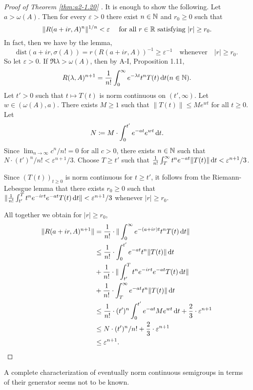 \begin{proof}[Proof of Theorem  \ref{thm:a2-1.20}  ]
It is enough to show the following.
Let $a > \omega(A)$.
Then for every $\varepsilon > 0$ there exist $n \in \mathbb{N}$ and $r_0 \geq 0$ such that
\[
\|R(a+ir,A)^n\|^{1/n} < \varepsilon \quad  \text{ for all } r \in \mathbb{R} \text{ satisfying } |r| \geq r_{0}.
\]
In fact, then we have by the lemma, 
\[
\text{dist}(a+ir,\sigma(A)) = r(R(a+ir,A))^{-1} \geq \varepsilon^{-1} \quad \text{whenever} \quad |r| \geq r_{0}.
\]
So let $\varepsilon > 0$.
If $\Re\lambda > \omega(A)$, then by A-I, Proposition 1.11,
\[
R(\lambda,A)^{n+1} = \frac{1}{n!}\int_0^\infty e^{-\lambda t}t^nT(t) \mathop{}\!\mathrm{d}{t} (n \in \mathbb{N}).
\]
Let $t' > 0$ such that $t \mapsto T(t)$ is norm continuous on $(t',\infty)$.
Let $w \in (\omega(A),a)$.
There exists $M \geq 1$ such that $\|T(t)\| \leq Me^{wt}$ for all $t \geq 0$.
Let 
\[
N \coloneqq M\cdot\int_{0}^{t'} e^{-at}e^{wt} \mathop{}\!\mathrm{d}{t}.
\]
Since $\lim_{n\to\infty} c^n/n! = 0$ for all $c > 0$, there exists $n \in \mathbb{N}$ such that \\ 
$N\cdot(t')^n/n! < \varepsilon^{n+1}/3$.
Choose $T \geq t'$ such that $\frac{1}{n!}\int_T^\infty t^ne^{-at}\|T(t)\| \mathop{}\!\mathrm{d}{t} < \varepsilon^{n+1}/3$.

Since $(T(t))_{t\geq 0}$ is norm continuous for $t \geq t'$, it follows from the Riemann-Lebesgue lemma that there exists $r_{0} \geq 0$ such that 
$\|\frac{1}{n!}\int_{t'}^T t^{n}e^{-irt}e^{-at}T(t) \mathop{}\!\mathrm{d}{t}\| < \varepsilon^{n+1}/3$ whenever $|r| \geq r_{0}$.

All together we obtain for $|r| \geq r_{0}$,
\begin{align*}
    \|R(a+ir,A)^{n+1}\| & = \frac{1}{n!}\cdot\|\int_0^\infty e^{-(a+ir)t}t^nT(t) \mathop{}\!\mathrm{d}{t}\| \\
    & \leq \frac{1}{n!}\cdot\int_{0}^{t'} e^{-at}t^n\|T(t)\| \mathop{}\!\mathrm{d}{t} \\
    & + \frac{1}{n!}\cdot\|\int_{t'}^T t^ne^{-irt}e^{-at}T(t) \mathop{}\!\mathrm{d}{t}\| \\
    & + \frac{1}{n!}\cdot\int_T^\infty e^{-at}t^n\|T(t)\| \mathop{}\!\mathrm{d}{t} \\
    & \leq \frac{1}{n!}\cdot(t')^{n}\int_{0}^{t'} e^{-at}Me^{wt} \mathop{}\!\mathrm{d}{t} + \frac{2}{3}\cdot\varepsilon^{n+1} \\
    & \leq N\cdot(t')^n/n! + \frac{2}{3}\cdot\varepsilon^{n+1} \\
    & \leq \varepsilon^{n+1}.
\end{align*}
\end{proof}

A complete characterization of eventually norm continuous semigroups in terms of their generator seems not to be known.

